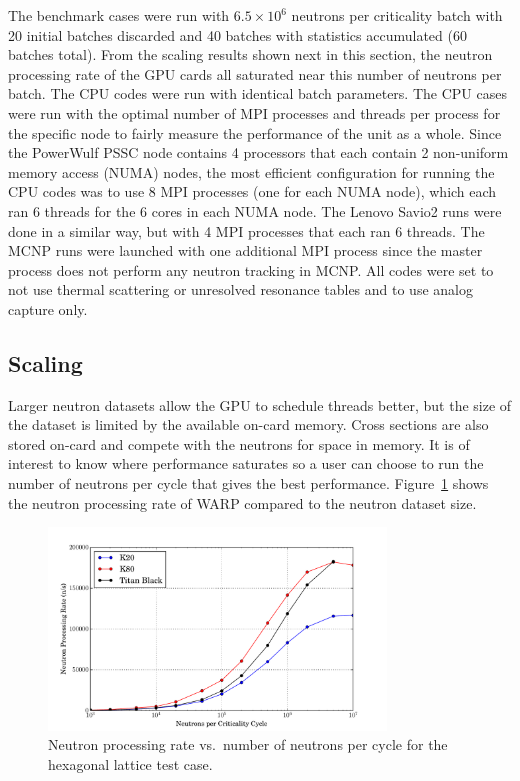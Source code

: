 \documentclass[preprint,12pt]{elsarticle}
\begin{document}
The benchmark cases were run with $6.5\times10^6$ neutrons per criticality batch with 20 initial batches discarded and 40 batches with statistics accumulated (60 batches total).  From the scaling results shown next in this section, the neutron processing rate of the GPU cards all saturated near this number of neutrons per batch.  The CPU codes were run with identical batch parameters.  The CPU cases were run with the optimal number of MPI processes and threads per process for the specific node to fairly measure the performance of the unit as a whole.  Since the PowerWulf PSSC node contains 4 processors that each contain 2 non-uniform memory access (NUMA) nodes, the most efficient configuration for running the CPU codes was to use 8 MPI processes (one for each NUMA node), which each ran 6 threads for the 6 cores in each NUMA node.  The Lenovo Savio2 runs were done in a similar way, but with 4 MPI processes that each ran 6 threads.  The MCNP runs were launched with one additional MPI process since the master process does not perform any neutron tracking in MCNP.  All codes were set to not use thermal scattering or unresolved resonance tables and to use analog capture only.

\subsection{Scaling}

Larger neutron datasets allow the GPU to schedule threads better, but the size of the dataset is limited by the available on-card memory.  Cross sections are also stored on-card and compete with the neutrons for space in memory.  It is of interest to know where performance saturates so a user can choose to run the number of neutrons per cycle that gives the best performance.  Figure~\ref{scaling} shows the neutron processing rate of WARP compared to the neutron dataset size.

\begin{figure}[h!]
\centering
\includegraphics[width=0.8\textwidth,trim= 1cm 0cm 1cm 0cm]{graphics/scaling.pdf}
\caption{Neutron processing rate vs.\ number of neutrons per cycle for the hexagonal lattice test case. \label{scaling} }
\end{figure}
\end{document}
